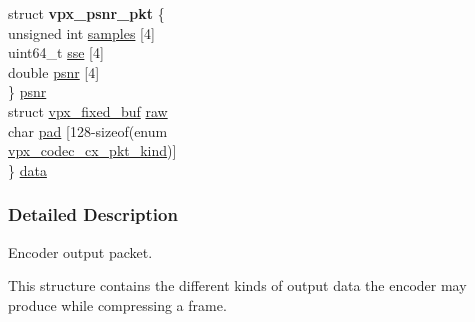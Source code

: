 \begin{DoxyCompactItemize}
\begin{tabbing}
\>struct {\bfseries vpx\_psnr\_pkt} \{\\
\>\>unsigned int \hyperlink{structvpx__codec__cx__pkt_a4d3fc7eb2d19c5913c6f3f474e5cf77b}{samples} \mbox{[}4\mbox{]}\\
\>\>uint64\_t \hyperlink{structvpx__codec__cx__pkt_ad65e918d3f26743cc7a8898b88bcb397}{sse} \mbox{[}4\mbox{]}\\
\>\>double \hyperlink{structvpx__codec__cx__pkt_a63744aeceb50355d6402d55309c151b6}{psnr} \mbox{[}4\mbox{]}\\
\>\} \hyperlink{structvpx__codec__cx__pkt_ac91dc0ee23d3d939b85eb82eb5ccc042}{psnr}\\
\>struct \hyperlink{structvpx__fixed__buf}{vpx\_fixed\_buf} \hyperlink{structvpx__codec__cx__pkt_acc7ee91ea9c907aea7c3b953324f7c26}{raw}\\
\>char \hyperlink{structvpx__codec__cx__pkt_a49a0ba012fdabd49bff8069dfacf6ced}{pad} \mbox{[}128-\/sizeof(enum \\
\>\>\hyperlink{group__encoder_ga28a79375279536526552af3a83d2ed72}{vpx\_codec\_cx\_pkt\_kind})\mbox{]}\\
\} \hyperlink{structvpx__codec__cx__pkt_a7f97b060a23b7e89fe5b885c0074f696}{data}\\

\end{tabbing}\end{DoxyCompactItemize}


\subsubsection{\-Detailed \-Description}
\-Encoder output packet. 

\-This structure contains the different kinds of output data the encoder may produce while compressing a frame. 


